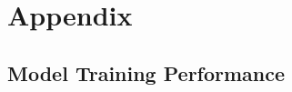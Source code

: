 \documentclass[a4paper,12pt]{report}
\begin{document}
% 





    
    
    






\chapter{Appendix}
\label{chap:appendix}

\section{Model Training Performance}
\label{sec:model_training}
\end{document}
